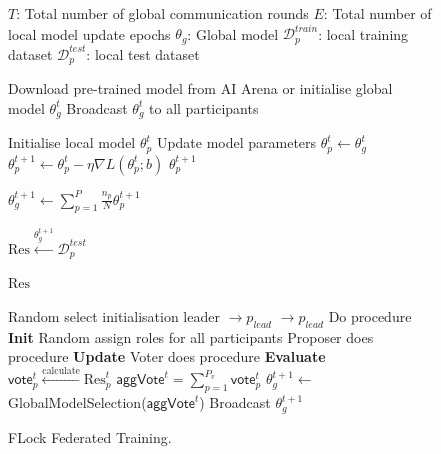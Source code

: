 \documentclass[conference]{IEEEtran}
\begin{document}
\begin{figure}[t]
\begin{mdframed}[backgroundcolor=gray!10, roundcorner=10pt]
\begin{algorithm}[H]
    \centering
    \begin{algorithmic}[1]
    \Statex 
    \Statex 
        \Statex $T$: Total number of global communication rounds
        \Statex $E$: Total number of local model update epochs
        \Statex $\theta_g$: Global model
        \Statex $\mathcal{D}_p^{train}$: local training dataset 
        \Statex $\mathcal{D}_p^{test}$: local test dataset 

        \State Download pre-trained model from AI Arena or initialise global model $\theta^t_g$
        \State Broadcast $\theta^t_g$ to all participants
    \EndProcedure
    
        \State Initialise local model $\theta^t_p$
        \State Update model parameters  $\theta^t_p \leftarrow \theta^t_g$
        \State $\theta^{t+1}_p \leftarrow \theta^{t}_p - \eta \nabla L(\theta^t_p ; b)$ \textcolor[HTML]{5E81B5}{}
        \State \Return $\theta^{t+1}_p$
    \EndProcedure

        \State $\theta^{t+1}_g \leftarrow \sum_{p=1}^P \frac{n_p}{N} \theta_p^{t+1}$ \textcolor[HTML]{5E81B5}{}

        \State $\text{Res} \xleftarrow{\theta^{t+1}_g} \mathcal{D}_p^{test}$  \textcolor[HTML]{5E81B5}{}
        
        \State \Return $\text{Res}$
    \EndProcedure

        \State Random select initialisation leader $\rightarrow p_{lead}$
        \State $\rightarrow p_{lead}$ Do procedure \textbf{Init}
            \State Random assign roles for all participants
            \State Proposer does procedure \textbf{Update}
            \State Voter does procedure \textbf{Evaluate}
            \State $\mathsf{vote}_p^t \xleftarrow{\text{calculate}} \text{Res}^t_p$
            \State $\mathsf{aggVote}^t= \sum_{p = 1}^{ P_v}  \mathsf{vote}_p^t$ \textcolor[HTML]{5E81B5}{}
            \State $\theta^{t+1}_g \leftarrow$ GlobalModelSelection($\mathsf{aggVote}^t$)
            \State Broadcast $\theta^{t+1}_g$
        \EndFor
    \EndProcedure
    
    \end{algorithmic}
    \caption{FLock Federated Training.}
    \label{algo:federated_learning}
\end{algorithm}
\end{mdframed}
\end{figure}
\end{document}
